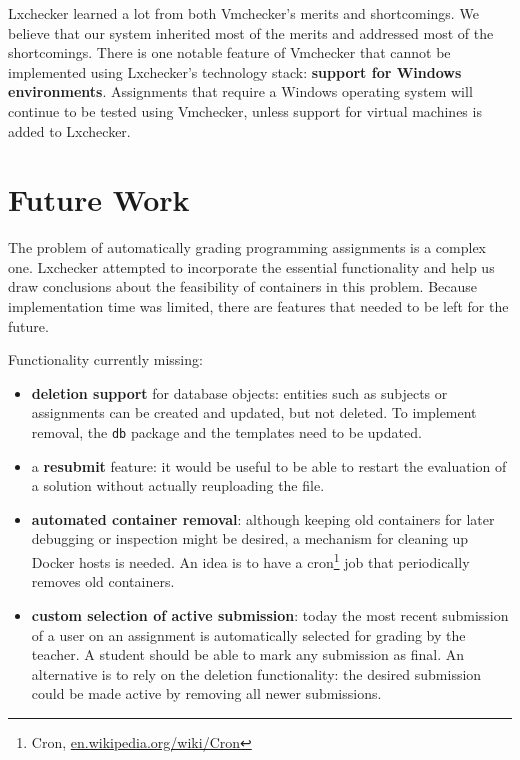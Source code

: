 Lxchecker learned a lot from both Vmchecker's merits and shortcomings. We believe that our system inherited most of the merits and addressed most of the shortcomings. There is one notable feature of Vmchecker that cannot be implemented using Lxchecker's technology stack: \textbf{support for Windows environments}. Assignments that require a Windows operating system will continue to be tested using Vmchecker, unless support for virtual machines is added to Lxchecker.

\section{Future Work}
\label{sec:future-work}

The problem of automatically grading programming assignments is a complex one. Lxchecker attempted to incorporate the essential functionality and help us draw conclusions about the feasibility of containers in this problem. Because implementation time was limited, there are features that needed to be left for the future.

Functionality currently missing:
\begin{itemize}
	\item \textbf{deletion support} for database objects: entities such as subjects or assignments can be created and updated, but not deleted. To implement removal, the \texttt{db} package and the templates need to be updated.
	\item a \textbf{resubmit} feature: it would be useful to be able to restart the evaluation of a solution without actually reuploading the file.
	\item \textbf{automated container removal}: although keeping old containers for later debugging or inspection might be desired, a mechanism for cleaning up Docker hosts is needed. An idea is to have a cron\footnote{Cron, \url{en.wikipedia.org/wiki/Cron}} job that periodically removes old containers.
	\item \textbf{custom selection of active submission}: today the most recent submission of a user on an assignment is automatically selected for grading by the teacher. A student should be able to mark any submission as final. An alternative is to rely on the deletion functionality: the desired submission could be made active by removing all newer submissions.
\end{itemize}


